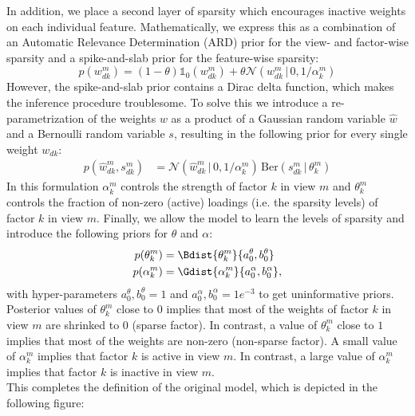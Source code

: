In addition, we place a second layer of sparsity which encourages inactive weights on each individual feature. Mathematically, we express this as a combination of an Automatic Relevance Determination (ARD) prior \cite{Mackay1996} for the view- and factor-wise sparsity and a spike-and-slab prior \cite{Mitchell1988} for the feature-wise sparsity:
\begin{equation}
	p(w_{dk}^{m}) = (1-\theta) \mathds{1}_0(w_{dk}^{m}) + \theta \mathcal{N} (w_{dk}^{m} \,|\, 0, 1/\alpha_k^m)
\end{equation}
However, the spike-and-slab prior contains a Dirac delta function, which makes the inference procedure troublesome. To solve this we introduce a re-parametrization of the weights $w$ as a product of a Gaussian random variable $\hat{w}$ and a Bernoulli random variable $s$, \cite{Titsias2011} resulting in the following prior for every single weight $w_{dk}$:
\begin{align}
	p(\hat{w}_{dk}^m,s_{dk}^m) &= \mathcal{N} (\hat{w}_{dk}^m \,|\, 0, 1/\alpha_k^m)\, \text{Ber}(s_{dk}^m \,|\,\theta_k^m)
\end{align}
In this formulation $\alpha_k^m$ controls the strength of factor $k$ in view $m$ and $\theta_k^m$ controls the fraction of non-zero (active) loadings (i.e. the sparsity levels) of factor $k$ in view $m$. Finally, we allow the model to learn the levels of sparsity and introduce the following priors for $\theta$ and $\alpha$:
\begin{align}
	p(\theta_k^m) &= \Bdist{\theta_k^m}{a_0^\theta,b_0^\theta}\\
	p(\alpha_k^m) &= \Gdist{\alpha_k^m}{a_0^\alpha, b_0^\alpha},
\end{align}
with hyper-parameters $a_0^\theta,b_0^\theta =1$ and $a_0^\alpha, b_0^\alpha=1e^{-3}$ to get uninformative priors. Posterior values of $\theta_k^m$ close to $0$ implies that most of the weights of factor $k$ in view $m$ are shrinked to $0$ (sparse factor). In contrast, a value of $\theta_k^m$ close to $1$ implies that most of the weights are non-zero (non-sparse factor). A small value of $\alpha_k^m$ implies that factor $k$ is active in view $m$. In contrast, a large value of $\alpha_k^m$ implies that factor $k$ is inactive in view $m$.\\
This completes the definition of the original model, which is depicted in the following figure:

